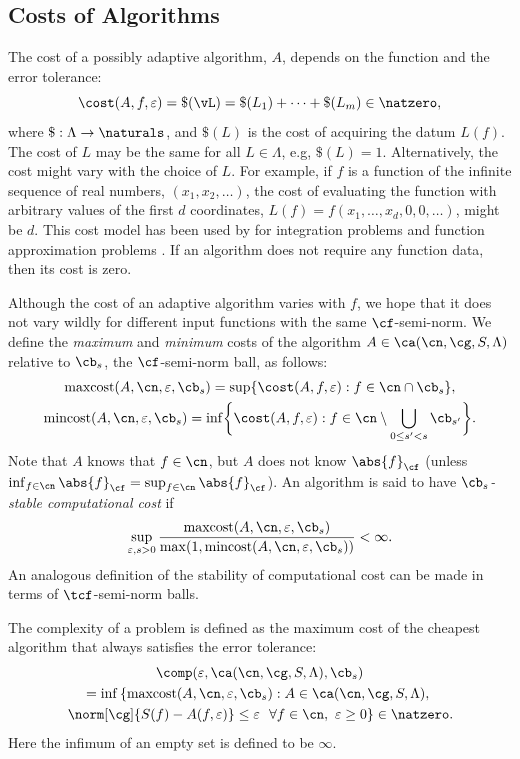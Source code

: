 \documentclass[]{elsarticle}
\DeclareMathOperator{\maxcost}{maxcost}
\DeclareMathOperator{\mincost}{mincost}
\theoremstyle{definition}
\theoremstyle{remark}
\newcommand{\Fnorm}[1]{\abs{#1}_{\cf}}
\begin{document}
\subsection{Costs of Algorithms} \label{AlgoCostsec}

The cost of a possibly adaptive algorithm, $A$, depends on the function and the error tolerance: 
\[
\cost(A,f,\varepsilon) = \$(\vL) = \$(L_1) + \cdots +\$(L_m) \in \natzero,
\]
where $\$:\Lambda \to \naturals$, and $\$(L)$ is the cost of acquiring the datum $L(f)$. The cost of $L$ may be the same for all $L \in \Lambda$, e.g, $\$(L)=1$.  Alternatively, the cost might vary with the choice of $L$.  For example, if $f$ is a function of the infinite sequence of real numbers, $(x_1, x_2, \ldots)$, the cost of evaluating the function with arbitrary values of the first $d$ coordinates, $L(f)=f(x_1, \ldots, x_d, 0, 0, \ldots)$, might be $d$.  This cost model has been used by for integration problems \cite{HicMGRitNiu09a,KuoEtal10a,NiuHic09a,NiuHic09b,PlaWas11a} and function approximation problems \cite{Was13a,WasWoz11a,WasWoz11b}.  If an algorithm does not require any function data, then its cost is zero.

Although the cost of an adaptive algorithm varies with $f$, we hope that it does not vary wildly for different input functions with the same $\cf$-semi-norm. We define the \emph{maximum} and \emph{minimum} costs of the algorithm $A\in \ca(\cn,\cg,S,\Lambda)$ relative to $\cb_{s}$, the $\cf$-semi-norm ball, as follows:
\begin{gather*}
\maxcost(A,\cn,\varepsilon,\cb_s)
= \sup \{ \cost(A,f,\varepsilon) : f \in \cn \cap \cb_{s} \}, \\ \mincost(A,\cn,\varepsilon,\cb_s)
= \inf \biggl \{ \cost(A,f,\varepsilon) : f \in \cn\setminus \bigcup_{0 \le s'<s}\cb_{s'} \biggr \} .
\end{gather*}
Note that $A$ knows that $f \in \cn$, but $A$ does not know $\Fnorm{f}$ (unless $\inf_{f \in \cn} \Fnorm{f}=\sup_{f \in \cn} \Fnorm{f}$).  An algorithm is said to have \emph{$\cb_{s}$-stable computational cost} if 
\begin{equation*}\label{coststabledef}
\sup_{\varepsilon, s > 0} \frac{\maxcost(A,\cn,\varepsilon,\cb_s)}{\max(1,\mincost(A,\cn,\varepsilon, \cb_s))} < \infty.
\end{equation*} 
An analogous definition of the stability of computational cost can be made in terms of $\tcf$-semi-norm balls.

The complexity of a problem is defined as the maximum cost of the cheapest algorithm that always satisfies the error tolerance:
\begin{multline*}
\comp(\varepsilon,\ca(\cn,\cg,S,\Lambda),\cb_s) \\
 = \inf\left\{\maxcost(A,\cn,\varepsilon,\cb_s) : A \in \ca(\cn,\cg,S,\Lambda), \right. \\
 \left . \norm[\cg]{S(f)-A(f,\varepsilon)} \le \varepsilon \ \ \forall f \in \cn, \ \varepsilon \ge 0 \right \} \in \natzero.
\end{multline*}
Here the infimum of an empty set is defined to be $\infty$.  
\end{document}
